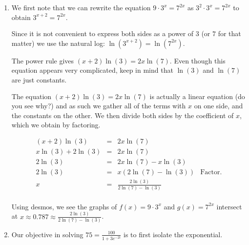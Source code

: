 \documentclass{ximera}
\begin{document}
\begin{example}
\begin{explanation}
\begin{enumerate}
Using desmos, we find the graphs of  $f(x) = 2000$ and $g(x) =  1000 \cdot 3^{-0.1 x}$ intersect at $x \approx -6.309 \approx -\frac{10\ln(2)}{\ln(3)} $.

\begin{center}
\end{center}

\item  We first note that we can rewrite the equation $9 \cdot 3^{x} = 7^{2x}$ as $3^2 \cdot 3^x = 7^{2x}$ to obtain $3^{x+2} = 7^{2x}$. 

Since it is not convenient to express both sides as a power of $3$ (or $7$ for that matter) we use the natural log:  $\ln\left(3^{x+2}\right) = \ln\left(7^{2x}\right)$.  



The power rule gives $(x+2) \ln(3) = 2x \ln(7)$.  Even though this equation appears very complicated, keep in mind that $\ln(3)$ and $\ln(7)$ are just constants.  



The equation $(x+2) \ln(3) = 2x \ln(7)$ is actually a linear equation (do you see why?) and as such we gather all of the terms with $x$ on one side, and the constants on the other.  We then divide both sides by the coefficient of $x$, which we obtain by factoring.

\[ \begin{array}{rclr}
(x+2) \ln(3) & = & 2x \ln(7) & \\

x \ln(3) + 2 \ln(3) & = & 2x \ln(7) & \\
2 \ln(3) & = & 2x \ln(7) - x \ln(3) & \\
2 \ln(3) & = & x (2 \ln(7) - \ln(3)) & \text{Factor.}\\
x & = & \frac{2 \ln(3)}{2\ln(7) - \ln(3)} & \\  
\end{array}\]

Using desmos, we see the graphs of $f(x) = 9 \cdot 3^{x}$ and $g(x) = 7^{2x}$ intersect at $x  \approx 0.787 \approx  \frac{2 \ln(3)}{2\ln(7) - \ln(3)}$.

\begin{center}
\end{center}

\item  Our objective in solving  $75 = \frac{100}{1 + 3e^{-2t}}$ is to first isolate the exponential.  




\end{enumerate}
\end{explanation}
\end{example}
\end{document}
